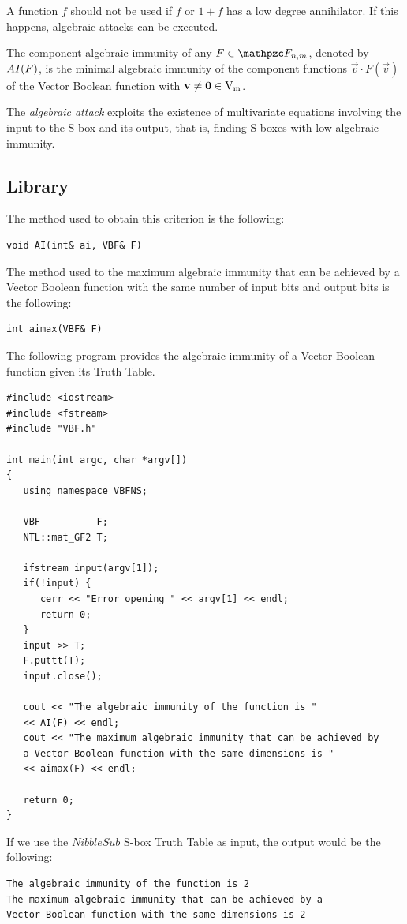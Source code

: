 A function $f$ should not be used if $f$ or $1 + f$ has a low degree annihilator. If this happens, algebraic attacks \cite{courtois2002cryptanalysis}
can be executed. 

\begin{definition}
The component algebraic immunity of any $F \in \funct{F}_{n,m}$, denoted by $\crit{AI}(F)$, is the minimal algebraic immunity of the component functions $\vec{v} \cdot
F (\vec{v})$ of the Vector Boolean function with $\vec{v} \neq \vec{0} \in \gf{V_m}$.
\end{definition}

The \textit{algebraic attack} exploits the existence of multivariate equations involving the input to the S-box and its output, that is, finding S-boxes with low algebraic immunity.

\subsection{Library}

The method used to obtain this criterion is the following:

\begin{verbatim}
void AI(int& ai, VBF& F)
\end{verbatim}

The method used to the maximum algebraic immunity that can be achieved by a Vector Boolean function with the same number of input bits and output bits is the following:

\begin{verbatim}
int aimax(VBF& F)
\end{verbatim}

\begin{example}
The following program provides the algebraic immunity of a Vector Boolean function given its Truth Table.

\begin{verbatim}
#include <iostream>
#include <fstream>
#include "VBF.h"

int main(int argc, char *argv[])
{
   using namespace VBFNS;

   VBF          F;
   NTL::mat_GF2 T;

   ifstream input(argv[1]);
   if(!input) {
      cerr << "Error opening " << argv[1] << endl;
      return 0;
   }
   input >> T;
   F.puttt(T);
   input.close();

   cout << "The algebraic immunity of the function is " 
   << AI(F) << endl;
   cout << "The maximum algebraic immunity that can be achieved by 
   a Vector Boolean function with the same dimensions is " 
   << aimax(F) << endl;

   return 0;
}
\end{verbatim}

If we use the $NibbleSub$ S-box Truth Table as input, the output would be the following:

\begin{verbatim}
The algebraic immunity of the function is 2
The maximum algebraic immunity that can be achieved by a
Vector Boolean function with the same dimensions is 2
\end{verbatim}

\end{example}

